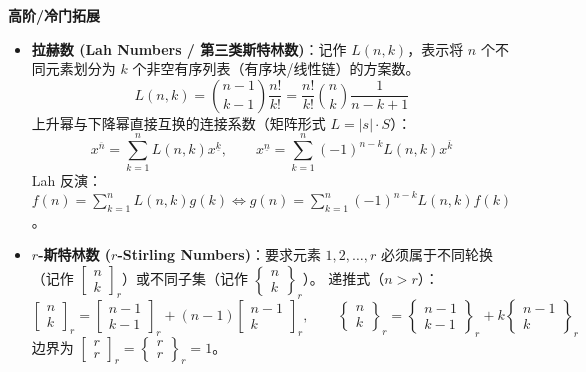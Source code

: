 \textbf{高阶/冷门拓展}
\begin{itemize}
    \item \textbf{拉赫数 (Lah Numbers / 第三类斯特林数)}：记作 $L(n, k)$，表示将 $n$ 个不同元素划分为 $k$ 个非空有序列表（有序块/线性链）的方案数。
    \[
    L(n, k) = \binom{n-1}{k-1} \frac{n!}{k!} = \frac{n!}{k!} \binom{n}{k} \frac{1}{n-k+1}
    \]
    上升幂与下降幂直接互换的连接系数（矩阵形式 $L = |s| \cdot S$）：
    \[
    x^{\overline{n}} = \sum_{k=1}^n L(n, k) x^{\underline{k}}, \qquad
    x^{\underline{n}} = \sum_{k=1}^n (-1)^{n-k} L(n, k) x^{\overline{k}}
    \]
    Lah 反演：$f(n) = \sum_{k=1}^n L(n, k) g(k) \iff g(n) = \sum_{k=1}^n (-1)^{n-k} L(n, k) f(k)$。
    \item \textbf{$r$-斯特林数 ($r$-Stirling Numbers)}：要求元素 $1, 2, \dots, r$ 必须属于不同轮换（记作 $\left[ \begin{matrix} n \\ k \end{matrix} \right]_r$）或不同子集（记作 $\left\{ \begin{matrix} n \\ k \end{matrix} \right\}_r$）。
    递推式（$n > r$）：
    \[
    \left[ \begin{matrix} n \\ k \end{matrix} \right]_r = \left[ \begin{matrix} n-1 \\ k-1 \end{matrix} \right]_r + (n-1) \left[ \begin{matrix} n-1 \\ k \end{matrix} \right]_r, \qquad
    \left\{ \begin{matrix} n \\ k \end{matrix} \right\}_r = \left\{ \begin{matrix} n-1 \\ k-1 \end{matrix} \right\}_r + k \left\{ \begin{matrix} n-1 \\ k \end{matrix} \right\}_r
    \]
    边界为 $\left[ \begin{matrix} r \\ r \end{matrix} \right]_r = \left\{ \begin{matrix} r \\ r \end{matrix} \right\}_r = 1$。

\end{itemize}
